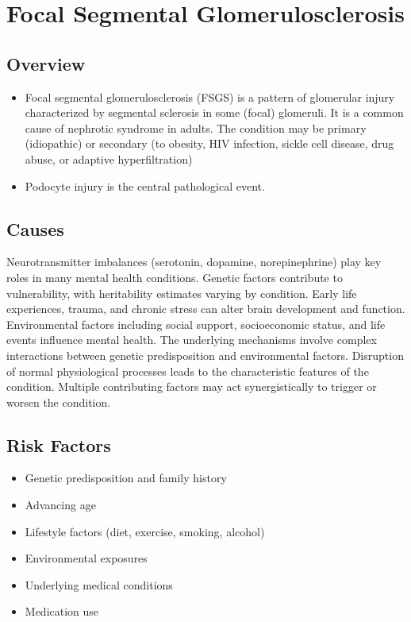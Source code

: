 \chapter{Focal Segmental Glomerulosclerosis}
\label{sec:Focal Segmental Glomerulosclerosis}

\section{Overview}


\begin{itemize}[noitemsep]
  \item Focal segmental glomerulosclerosis (FSGS) is a pattern of glomerular injury characterized by segmental sclerosis in some (focal) glomeruli. It is a common cause of nephrotic syndrome in adults. The condition may be primary (idiopathic) or secondary (to obesity, HIV infection, sickle cell disease, drug abuse, or adaptive hyperfiltration)
  \item Podocyte injury is the central pathological event.
\end{itemize}
\section{Causes}
Neurotransmitter imbalances (serotonin, dopamine, norepinephrine) play key roles in many mental health conditions. Genetic factors contribute to vulnerability, with heritability estimates varying by condition. Early life experiences, trauma, and chronic stress can alter brain development and function. Environmental factors including social support, socioeconomic status, and life events influence mental health. The underlying mechanisms involve complex interactions between genetic predisposition and environmental factors. Disruption of normal physiological processes leads to the characteristic features of the condition. Multiple contributing factors may act synergistically to trigger or worsen the condition.
\section{Risk Factors}
\begin{itemize}[noitemsep]
  \item Genetic predisposition and family history
  \item Advancing age
  \item Lifestyle factors (diet, exercise, smoking, alcohol)
  \item Environmental exposures
  \item Underlying medical conditions
  \item Medication use
\end{itemize}
